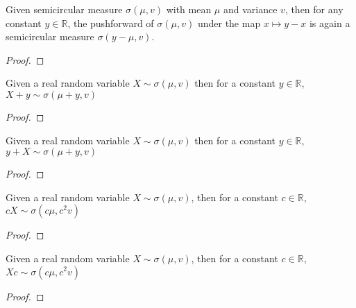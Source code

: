 \begin{lemma}
  \label{lem:semicircleReal_map_const_sub}
  \leanok
   Given semicircular measure $\sigma(\mu, v)$ with mean $\mu$ and variance $v$, then for any constant $y \in \mathbb{R}$, the pushforward
  of $\sigma(\mu, v)$ under the map $x \mapsto y - x$ is again a semicircular measure $\sigma(y - \mu, v)$. 
  \begin{proof}

  \end{proof}
\end{lemma}


\begin{lemma}
  \label{lem:semicircleReal_add_const}
  \leanok
  Given a real random variable $X \sim \sigma(\mu, v)$
  then for a constant $y \in \mathbb{R}$, $X + y \sim \sigma(\mu + y, v)$
  \begin{proof}
  \end{proof}
\end{lemma}


\begin{lemma}
  \label{lem:semicircleReal_const_add}
  \leanok
  Given a real random variable $X \sim \sigma(\mu, v)$
  then for a constant $y \in \mathbb{R}$, $y + X \sim \sigma(\mu + y, v)$
  \begin{proof}

  \end{proof}
\end{lemma}


\begin{lemma}
  \label{lem:semicircleReal_const_mul}
  \leanok
  Given a real random variable $X \sim \sigma(\mu, v)$,
  then for a constant $c \in \mathbb{R}$, $cX \sim \sigma(c\mu , c^2v)$
  \begin{proof}

  \end{proof}
\end{lemma}


\begin{lemma}
  \label{lem:semicircleReal_mul_const}
  \leanok
   Given a real random variable $X \sim \sigma(\mu, v)$,
  then for a constant $c \in \mathbb{R}$, $Xc \sim \sigma(c \mu  , c^2v)$
  \begin{proof}

  \end{proof}
\end{lemma}

